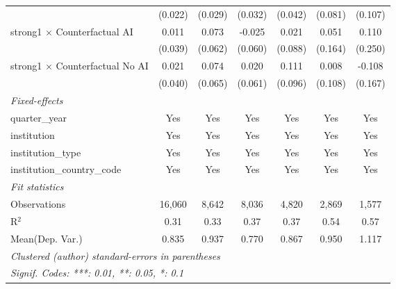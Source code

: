 \begin{tabular}{lcccccc}
                                          & (0.022)       & (0.029)       & (0.032)       & (0.042)       & (0.081)      & (0.107)\\   
   strong1 $\times$ Counterfactual AI     & 0.011         & 0.073         & -0.025        & 0.021         & 0.051        & 0.110\\   
                                          & (0.039)       & (0.062)       & (0.060)       & (0.088)       & (0.164)      & (0.250)\\   
   strong1 $\times$ Counterfactual No AI  & 0.021         & 0.074         & 0.020         & 0.111         & 0.008        & -0.108\\   
                                          & (0.040)       & (0.065)       & (0.061)       & (0.096)       & (0.108)      & (0.167)\\   
   \midrule
   \emph{Fixed-effects}\\
   quarter\_year                          & Yes           & Yes           & Yes           & Yes           & Yes          & Yes\\  
   institution                            & Yes           & Yes           & Yes           & Yes           & Yes          & Yes\\  
   institution\_type                      & Yes           & Yes           & Yes           & Yes           & Yes          & Yes\\  
   institution\_country\_code             & Yes           & Yes           & Yes           & Yes           & Yes          & Yes\\  
   \midrule
   \emph{Fit statistics}\\
   Observations                           & 16,060        & 8,642         & 8,036         & 4,820         & 2,869        & 1,577\\  
   R$^2$                                  & 0.31          & 0.33          & 0.37          & 0.37          & 0.54         & 0.57\\  
Mean(Dep. Var.) & 0.835 & 0.937 & 0.770 & 0.867 & 0.950 & 1.117 \\
   \midrule \midrule
   \multicolumn{7}{l}{\emph{Clustered (author) standard-errors in parentheses}}\\
   \multicolumn{7}{l}{\emph{Signif. Codes: ***: 0.01, **: 0.05, *: 0.1}}\\
\end{tabular}
\par\endgroup
